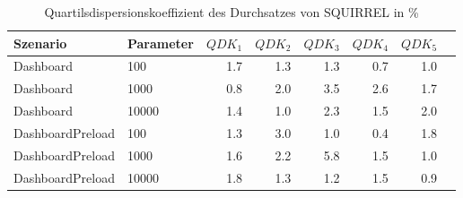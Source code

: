 
\begin{table}[ht]
\setlength{\extrarowheight}{-1pt}
\centering
\caption{Quartilsdispersionskoeffizient des Durchsatzes von SQUIRREL in \%}
\begin{tabular}{llrrrrrr}
\toprule
Szenario & Parameter & ${QDK_1}$ & ${QDK_2}$ & ${QDK_3}$& ${QDK_4}$ & ${QDK_5}$ \\
\midrule
	Dashboard & 100 &  1.7 &  1.3 &  1.3 &  0.7 &  1.0 \\
	Dashboard & 1000 &  0.8 &  2.0 & \cellcolor{red!11}  3.5 & \cellcolor{red!11}  2.6 &  1.7 \\
	Dashboard & 10000 &  1.4 &  1.0 & \cellcolor{red!11}  2.3 &  1.5 &  2.0 \\
	DashboardPreload & 100 &  1.3 & \cellcolor{red!11}  3.0 &  1.0 &  0.4 &  1.8 \\
	DashboardPreload & 1000 &  1.6 & \cellcolor{red!11}  2.2 & \cellcolor{red!12}  5.8 &  1.5 &  1.0 \\
	DashboardPreload & 10000 &  1.8 &  1.3 &  1.2 &  1.5 &  0.9 \\
\bottomrule
\end{tabular}
\label{tab:quartilsdispersionskoeffizient_durchsatz_squirrel}
\end{table}
	